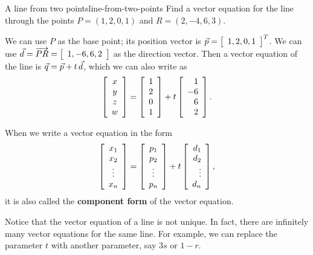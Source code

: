 \documentclass{ximera}
\begin{document}
\begin{example}{A line from two points}{line-from-two-points}
  Find a vector equation for the line through the points
  $P = (1,2,0,1)$ and $R = (2,-4,6,3)$.
\end{example}

\begin{solution}
  We can use $P$ as the base point; its position vector is
  $\vect{p}=\startmat{c}1,2,0,1\stopmat^T$. We can use
  $\vect{d}=\longvect{PR}=\startmat{c}1,-6,6,2\stopmat$ as the direction vector. Then
  a vector equation of the line is
  $\vect{q} = \vect{p} + t\,\vect{d}$,
  which we can also write as
  \begin{equation*}
    \startmat{c} x \\ y \\ z \\ w \stopmat
    = \startmat{c} 1 \\ 2 \\ 0 \\ 1\stopmat
    + t \startmat{r} 1 \\ -6 \\ 6 \\ 2\stopmat.
  \end{equation*}
\end{solution}

When we write a vector equation in the form
\begin{equation*}
  \startmat{c} x_1 \\ x_2 \\ \vdots \\ x_n \stopmat
  = \startmat{c} p_1 \\ p_2 \\ \vdots \\ p_n \stopmat
  + t \startmat{r} d_1 \\ d_2 \\ \vdots \\ d_n \stopmat,
\end{equation*}
it is also called the \textbf{component form}%
%
%
 of the vector equation.

Notice that the vector equation of a line is not unique. In fact,
there are infinitely many vector equations for the same line. For
example, we can replace the parameter $t$ with another parameter, say
$3s$ or $1-r$.
\end{document}
